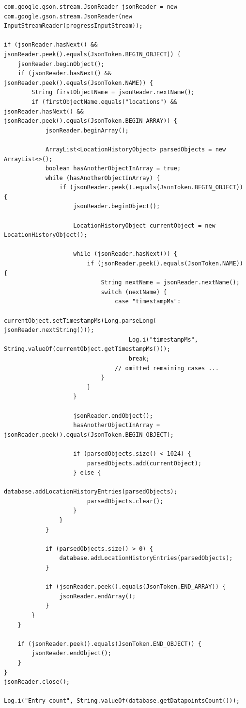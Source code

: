 \documentclass[12p]{article}
\begin{document}
\begin{verbatim}
com.google.gson.stream.JsonReader jsonReader = new com.google.gson.stream.JsonReader(new InputStreamReader(progressInputStream));

if (jsonReader.hasNext() && jsonReader.peek().equals(JsonToken.BEGIN_OBJECT)) {
    jsonReader.beginObject(); 
    if (jsonReader.hasNext() && jsonReader.peek().equals(JsonToken.NAME)) { 
        String firstObjectName = jsonReader.nextName(); 
        if (firstObjectName.equals("locations") && jsonReader.hasNext() && jsonReader.peek().equals(JsonToken.BEGIN_ARRAY)) { 
            jsonReader.beginArray(); 

            ArrayList<LocationHistoryObject> parsedObjects = new ArrayList<>();
            boolean hasAnotherObjectInArray = true;
            while (hasAnotherObjectInArray) { 
                if (jsonReader.peek().equals(JsonToken.BEGIN_OBJECT)) {
                    jsonReader.beginObject();

                    LocationHistoryObject currentObject = new LocationHistoryObject();

                    while (jsonReader.hasNext()) {
                        if (jsonReader.peek().equals(JsonToken.NAME)) {
                            String nextName = jsonReader.nextName();
                            switch (nextName) {
                                case "timestampMs": 
                                    currentObject.setTimestampMs(Long.parseLong( jsonReader.nextString()));
                                    Log.i("timestampMs", String.valueOf(currentObject.getTimestampMs()));
                                    break;
                                // omitted remaining cases ...
                            }
                        }
                    }

                    jsonReader.endObject();
                    hasAnotherObjectInArray = jsonReader.peek().equals(JsonToken.BEGIN_OBJECT); 

                    if (parsedObjects.size() < 1024) {
                        parsedObjects.add(currentObject);
                    } else {        
                        database.addLocationHistoryEntries(parsedObjects);
                        parsedObjects.clear();
                    }
                }
            }

            if (parsedObjects.size() > 0) {
                database.addLocationHistoryEntries(parsedObjects);
            }

            if (jsonReader.peek().equals(JsonToken.END_ARRAY)) {
                jsonReader.endArray();
            }
        }
    }

    if (jsonReader.peek().equals(JsonToken.END_OBJECT)) { 
        jsonReader.endObject();
    }
}
jsonReader.close();

Log.i("Entry count", String.valueOf(database.getDatapointsCount()));
\end{verbatim}
    
\end{document}
